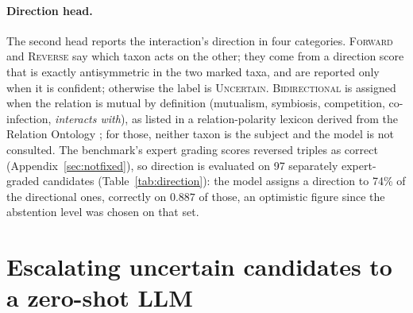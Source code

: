 \documentclass[11pt]{article}
\begin{document}
\paragraph{Direction head.}\label{app:direction}
The second head reports the interaction's direction in four categories. \textsc{Forward} and
\textsc{Reverse} say which taxon acts on the other; they come from a direction score that is exactly
antisymmetric in the two marked taxa, and are reported only when it is confident; otherwise the
label is \textsc{Uncertain}. \textsc{Bidirectional} is assigned when the relation is mutual by
definition (mutualism, symbiosis, competition, co-infection, \emph{interacts with}), as listed in a
relation-polarity lexicon derived from the Relation Ontology \citep{smith2005relations}; for those, neither taxon is the subject
and the model is not consulted. The benchmark's expert grading scores reversed triples as correct
(Appendix~\ref{sec:notfixed}), so direction is evaluated on 97 separately expert-graded candidates
(Table~\ref{tab:direction}): the model assigns a direction to 74\% of the directional ones, correctly on $0.887$ of
those, an optimistic figure since the abstention level was chosen on that set.

\section{Escalating uncertain candidates to a zero-shot LLM}
\label{app:cascade}

\begin{table}[t]\centering\footnotesize
\setlength{\tabcolsep}{2.6pt}
\caption{The recommended model with its candidate rules keeps its own decision except on the band of
candidates whose score lies nearest its threshold, which take a zero-shot LLM's answer to
the pair question (Qwen3-32B, the teacher, or Qwen3.5-122B-A10B); 437 rows. A rule rejection is final.
Band 0\% is the recommended model alone, 100\% the LLM alone (with the rules).}
\label{tab:cascade}
\end{table}
\end{document}
